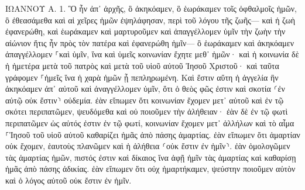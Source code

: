 \documentclass[twoside, 9pt]{extreport}
\begin{document}
ΙΩΑΝΝΟΥ Α.
1.
Ὃ ἦν ἀπ᾽ ἀρχῆς, ὃ ἀκηκόαμεν, ὃ ἑωράκαμεν τοῖς ὀφθαλμοῖς ἡμῶν, ὃ ἐθεασάμεθα καὶ αἱ χεῖρες ἡμῶν ἐψηλάφησαν, περὶ τοῦ λόγου τῆς ζωῆς— 
καὶ ἡ ζωὴ ἐφανερώθη, καὶ ἑωράκαμεν καὶ μαρτυροῦμεν καὶ ἀπαγγέλλομεν ὑμῖν τὴν ζωὴν τὴν αἰώνιον ἥτις ἦν πρὸς τὸν πατέρα καὶ ἐφανερώθη ἡμῖν— 
ὃ ἑωράκαμεν καὶ ἀκηκόαμεν ἀπαγγέλλομεν ⸀καὶ ὑμῖν, ἵνα καὶ ὑμεῖς κοινωνίαν ἔχητε μεθ᾽ ἡμῶν· καὶ ἡ κοινωνία δὲ ἡ ἡμετέρα μετὰ τοῦ πατρὸς καὶ μετὰ τοῦ υἱοῦ αὐτοῦ Ἰησοῦ Χριστοῦ· 
καὶ ταῦτα γράφομεν ⸀ἡμεῖς ἵνα ἡ χαρὰ ἡμῶν ᾖ πεπληρωμένη. 
Καὶ ἔστιν αὕτη ἡ ἀγγελία ἣν ἀκηκόαμεν ἀπ᾽ αὐτοῦ καὶ ἀναγγέλλομεν ὑμῖν, ὅτι ὁ θεὸς φῶς ἐστιν καὶ σκοτία ⸂ἐν αὐτῷ οὐκ ἔστιν⸃ οὐδεμία. 
ἐὰν εἴπωμεν ὅτι κοινωνίαν ἔχομεν μετ᾽ αὐτοῦ καὶ ἐν τῷ σκότει περιπατῶμεν, ψευδόμεθα καὶ οὐ ποιοῦμεν τὴν ἀλήθειαν· 
ἐὰν δὲ ἐν τῷ φωτὶ περιπατῶμεν ὡς αὐτός ἐστιν ἐν τῷ φωτί, κοινωνίαν ἔχομεν μετ᾽ ἀλλήλων καὶ τὸ αἷμα ⸀Ἰησοῦ τοῦ υἱοῦ αὐτοῦ καθαρίζει ἡμᾶς ἀπὸ πάσης ἁμαρτίας. 
ἐὰν εἴπωμεν ὅτι ἁμαρτίαν οὐκ ἔχομεν, ἑαυτοὺς πλανῶμεν καὶ ἡ ἀλήθεια ⸂οὐκ ἔστιν ἐν ἡμῖν⸃. 
ἐὰν ὁμολογῶμεν τὰς ἁμαρτίας ἡμῶν, πιστός ἐστιν καὶ δίκαιος ἵνα ἀφῇ ἡμῖν τὰς ἁμαρτίας καὶ καθαρίσῃ ἡμᾶς ἀπὸ πάσης ἀδικίας. 
ἐὰν εἴπωμεν ὅτι οὐχ ἡμαρτήκαμεν, ψεύστην ποιοῦμεν αὐτὸν καὶ ὁ λόγος αὐτοῦ οὐκ ἔστιν ἐν ἡμῖν. 
\end{document}
